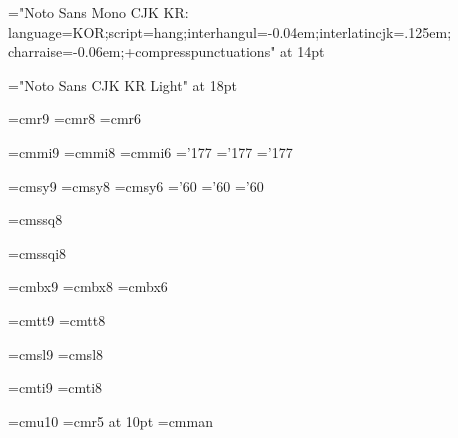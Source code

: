 \let\Glattitlefont=\ttitlefont
\sethangulfont\Ghantitlefont="Noto Sans Mono CJK KR:%
  language=KOR;script=hang;interhangul=-0.04em;interlatincjk=.125em;%
  charraise=-0.06em;+compresspunctuations" at 14pt
\def\ttitlefont{\Glattitlefont\Ghantitlefont}

\font\sectionfont="Noto Sans CJK KR Light" at 18pt

\font\ninerm=cmr9
\let\mc=\ninerm %
\font\eightrm=cmr8
\font\sixrm=cmr6

\font\ninei=cmmi9
\font\eighti=cmmi8
\font\sixi=cmmi6
\skewchar\ninei='177 \skewchar\eighti='177 \skewchar\sixi='177

\font\ninesy=cmsy9
\font\eightsy=cmsy8
\font\sixsy=cmsy6
\skewchar\ninesy='60 \skewchar\eightsy='60 \skewchar\sixsy='60

\font\eightss=cmssq8

\font\eightssi=cmssqi8

\font\ninebf=cmbx9
\font\eightbf=cmbx8
\font\sixbf=cmbx6

\font\ninett=cmtt9
\font\eighttt=cmtt8

\hyphenchar{} %
\hyphenchar{}
\hyphenchar{}

\font\ninesl=cmsl9
\font\eightsl=cmsl8

\font\nineit=cmti9
\font\eightit=cmti8

\font\tenu=cmu10 %
\font\magnifiedfiverm=cmr5 at 10pt
\font\cmman=cmman %

%
\newskip\ttglue
\def\tenpoint{\def\rm{\fam0\tenrm\tenmj}%
  \textfont0=\tenrm \scriptfont0=\sevenrm \scriptscriptfont0=\fiverm
  \textfont1=\teni \scriptfont1=\seveni \scriptscriptfont1=\fivei
  \textfont2=\tensy \scriptfont2=\sevensy \scriptscriptfont2=\fivesy
  \textfont3=\tenex \scriptfont3=\tenex \scriptscriptfont3=\tenex
  \setmathhangulfonts\texthangul\scripthangul\scriptscripthangul
  \def\it{\fam\itfam\tenit\tengt}%
  \textfont\itfam=\tenit
  \def\sl{\fam\slfam\tensl\tengt}%
  \textfont\slfam=\tensl
  \def\bf{\fam\bffam\tenbf\tenbd}%
  \textfont\bffam=\tenbf \scriptfont\bffam=\sevenbf
  \scriptscriptfont\bffam=\fivebf
  \def\tt{\fam\ttfam\tentt\tentz}%
  \textfont\ttfam=\tentt
  \tt \ttglue=.5em plus.25em minus.15em
  \normalbaselineskip=15pt
  \let\sc=\eightrm
  \let\big=\tenbig
  \setbox\strutbox=\hbox{\vrule height8.5pt depth3.5pt width\z@}%
  \normalbaselines\rm}

